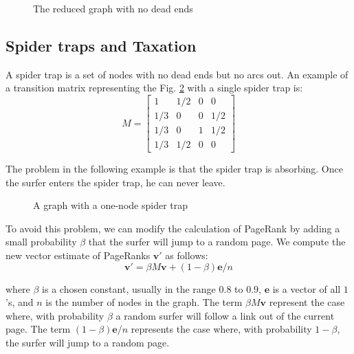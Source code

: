 \begin{figure}[H]
\centering
\scalebox{1}{
    
}
\caption{The reduced graph with no dead ends}
\label{fig:graph-reduced-no-dead-ends}
\end{figure}

\subsection{Spider traps and Taxation}\label{subsec:spider-traps-taxation}

A spider trap is a set of nodes with no dead ends but no arcs out. An example of a transition matrix representing the Fig. \ref{fig:graph-spider-trap} with a single spider trap is:
\begin{equation*}
    M = 
    \begin{bmatrix}
        1 & 1/2 & 0 & 0 \\
        1/3 & 0 & 0 & 1/2 \\
        1/3 & 0 & 1 & 1/2 \\
        1/3 & 1/2 & 0 & 0
    \end{bmatrix}
\end{equation*}

The problem in the following example is that the spider trap is absorbing. Once the surfer enters the spider trap, he can never leave.

\begin{figure}[H]
\centering
\scalebox{1}{
    
}
\caption{A graph with a one-node spider trap}
\label{fig:graph-spider-trap}
\end{figure}

To avoid this problem, we can modify the calculation of PageRank by adding a small probability $\beta$ that the surfer will jump to a random page. We compute the new vector estimate of PageRanks $\textbf{v}'$ as follows: 
\begin{equation}\label{eq:taxation}
    \textbf{v}' = \beta M \textbf{v} + (1 - \beta) \textbf{e} / n
\end{equation}

where $\beta$ is a chosen constant, usually in the range $0.8$ to $0.9$, $\textbf{e}$ is a vector of all $1$'s, and $n$ is the number of nodes in the graph. The term $\beta M \textbf{v}$ represent the case where, with probability $\beta$ a random surfer will follow a link out of the current page. The term $(1 - \beta) \textbf{e} / n$ represents the case where, with probability $1 - \beta$, the surfer will jump to a random page.

